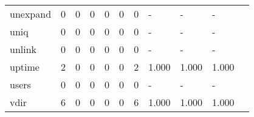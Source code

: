 \begin{longtable}{lp{1.2cm}p{1.2cm}p{1.2cm}p{1.2cm}p{1.2cm}p{1.2cm}p{1.2cm}p{1.2cm}p{1.2cm}p{1.2cm}}
unexpand  &                                     0 &                                                  0 &                                                  0 &                                                  0 &                                                  0 &                                                  0 &                                                  - &                                                  - &                                                  - \\
uniq      &                                     0 &                                                  0 &                                                  0 &                                                  0 &                                                  0 &                                                  0 &                                                  - &                                                  - &                                                  - \\
unlink    &                                     0 &                                                  0 &                                                  0 &                                                  0 &                                                  0 &                                                  0 &                                                  - &                                                  - &                                                  - \\
uptime    &                                     2 &                                                  0 &                                                  0 &                                                  0 &                                                  0 &                                                  2 &                                              1.000 &                                              1.000 &                                              1.000 \\
users     &                                     0 &                                                  0 &                                                  0 &                                                  0 &                                                  0 &                                                  0 &                                                  - &                                                  - &                                                  - \\
vdir      &                                     6 &                                                  0 &                                                  0 &                                                  0 &                                                  0 &                                                  6 &                                              1.000 &                                              1.000 &                                              1.000 \\

\end{longtable}
